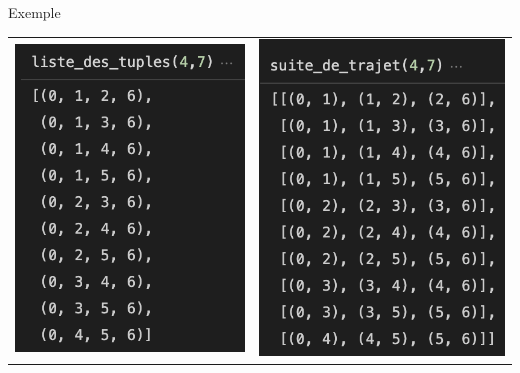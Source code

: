 \documentclass{beamer}
\begin{document}
 \begin{frame}{Exemple}
    \begin{center}
        \begin{tabular}{c c}
            \includegraphics[scale = 0.617]{liste_tuples.png} & \includegraphics[scale = 0.6]{suite_trajet.png} \\
        \end{tabular}
    \end{center}
\end{frame}
 
\end{document}
